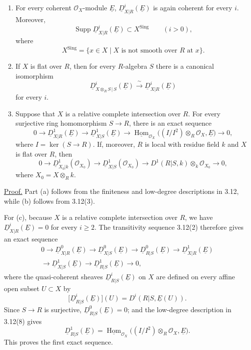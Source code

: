 \begin{enumerate}[label=(\alph*)]
\item For every coherent $\mathcal O_X$-module $\underline E$,
$\underline D^i_{X|R}(\underline E)$ is again coherent for every
$i$. Moreover,
\[
 \operatorname{Supp}\underline D^i_{X|R}(\underline E)
 \subset X^{\mathrm{Sing}}
 \qquad(i>0),
\]
where
\[
 X^{\mathrm{Sing}}
 =\{x\in X\mid X\text{ is not smooth over }R\text{ at }x\}.
\]

\item If $X$ is flat over $R$, then for every $R$-algebra $S$ there
is a canonical isomorphism
\[
 \underline D^i_{X\otimes_RS\,|\,S}(\underline E)
 \xrightarrow{\ \sim\ }
 \underline D^i_{X|R}(\underline E)
\]
for every $i$.

\item Suppose that $X$ is a relative complete intersection over
$R$. For every surjective ring homomorphism $S\longrightarrow R$,
there is an exact sequence
\[
0\longrightarrow\underline D^1_{X|R}(\underline E)
\longrightarrow\underline D^1_{X|S}(\underline E)
\longrightarrow
\underline{\operatorname{Hom}}_{\mathcal O_X}
 \bigl((I/I^2)\otimes_R\mathcal O_X,\underline E\bigr)
\longrightarrow0,
\]
where $I=\ker(S\longrightarrow R)$. If, moreover, $R$ is local
with residue field $k$ and $X$ is flat over $R$, then
\[
0\longrightarrow
 \underline D^1_{X_0|k}(\mathcal O_{X_0})
\longrightarrow
 \underline D^1_{X|S}(\mathcal O_{X_0})
\longrightarrow
 D^1(R|S,k)\otimes_k\mathcal O_{X_0}
\longrightarrow0,
\]
where $X_0=X\otimes_Rk$.
\end{enumerate}

\underline{Proof.}
Part (a) follows from the finiteness and low-degree descriptions in
3.12, while (b) follows from 3.12(3).

For (c), because $X$ is a relative complete intersection over $R$,
we have $\underline D^i_{X|R}(\underline E)=0$ for every $i\geq2$.
The transitivity sequence 3.12(2) therefore gives an exact sequence
\begin{multline*}
0\longrightarrow\underline D^0_{X|R}(\underline E)
\longrightarrow\underline D^0_{X|S}(\underline E)
\longrightarrow\underline D^0_{R|S}(\underline E)
\longrightarrow\underline D^1_{X|R}(\underline E)\\
\longrightarrow\underline D^1_{X|S}(\underline E)
\longrightarrow\underline D^1_{R|S}(\underline E)
\longrightarrow0,
\end{multline*}
where the quasi-coherent sheaves
$\underline D^i_{R|S}(\underline E)$ on $X$ are defined on every
affine open subset $U\subset X$ by
\[
 \bigl[\underline D^i_{R|S}(\underline E)\bigr](U)
 =D^i(R|S,\underline E(U)).
\]
Since $S\longrightarrow R$ is surjective,
$\underline D^0_{R|S}(\underline E)=0$; and the low-degree
description in 3.12(8) gives
\[
 \underline D^1_{R|S}(\underline E)
 =\underline{\operatorname{Hom}}_{\mathcal O_X}
  \bigl((I/I^2)\otimes_R\mathcal O_X,\underline E\bigr).
\]
This proves the first exact sequence.


